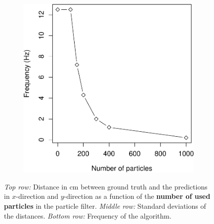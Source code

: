 \documentclass[11pt]{report}
\begin{document}
\begin{figure}[H]
\begin{subfigure}[b]{0.45\textwidth}
  \end{subfigure}
\par\bigskip %
  \begin{subfigure}[b]{0.45\textwidth}
  \includegraphics[width=1\textwidth]{particles_vs_freq-crop}
  \end{subfigure}
  \caption{\emph{Top row:} Distance in cm between ground truth and the
    predictions in $x$-direction and $y$-direction as a function of
    the \textbf{number of used particles} in the particle filter. \emph{Middle
      row:} Standard deviations of the distances. \emph{Bottom row:}
    Frequency of the algorithm.}
  \label{fig:tradepart}
\end{figure}
\end{document}

